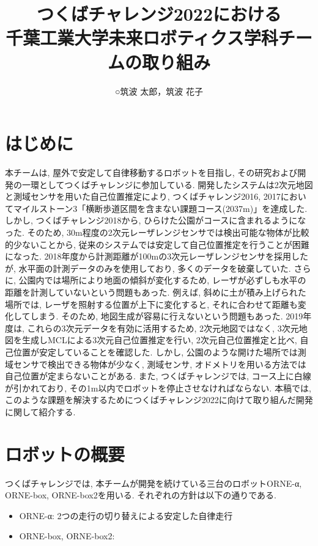 \documentclass[uplatex, twocolumn, 9pt]{jsproceedings}
\title{つくばチャレンジ2022における\\千葉工業大学未来ロボティクス学科チームの取り組み}
\author{○筑波 太郎\authorrefmark{1}，筑波 花子\authorrefmark{1}}
\affiliation{千葉工業大学未来ロボティクス学科チームα, box, box2}
\begin{document}
\maketitle


\section{はじめに}
本チームは, 屋外で安定して自律移動するロボットを目指し, その研究および開発の一環としてつくばチャレンジに参加している. 開発したシステムは2次元地図と測域センサを用いた自己位置推定により, つくばチャレンジ2016, 2017においてマイルストーン3「横断歩道区間を含まない課題コース(2037m)」を達成した. しかし, つくばチャレンジ2018から, ひらけた公園がコースに含まれるようになった. そのため, 30m程度の2次元レーザレンジセンサでは検出可能な物体が比較的少ないことから, 従来のシステムでは安定して自己位置推定を行うことが困難になった. 2018年度から計測距離が100mの3次元レーザレンジセンサを採用したが, 水平面の計測データのみを使用しており, 多くのデータを破棄していた. さらに, 公園内では場所により地面の傾斜が変化するため, レーザが必ずしも水平の距離を計測していないという問題もあった. 例えば, 斜めに土が積み上げられた場所では, レーザを照射する位置が上下に変化すると, それに合わせて距離も変化してしまう. そのため, 地図生成が容易に行えないという問題もあった. 2019年度は, これらの3次元データを有効に活用するため, 2次元地図ではなく, 3次元地図を生成しMCLによる3次元自己位置推定を行い, 2次元自己位置推定と比べ, 自己位置が安定していることを確認した. しかし, 公園のような開けた場所では測域センサで検出できる物体が少なく, 測域センサ, オドメトリを用いる方法では自己位置が定まらないことがある. また, つくばチャレンジでは, コース上に白線が引かれており, その1m以内でロボットを停止させなければならない. 本稿では, このような課題を解決するためにつくばチャレンジ2022に向けて取り組んだ開発に関して紹介する. 

\section{ロボットの概要}
つくばチャレンジでは, 本チームが開発を続けている三台のロボットORNE-α, ORNE-box, ORNE-box2を用いる. それぞれの方針は以下の通りである. 
\begin{itemize}
  \item ORNE-α: 2つの走行の切り替えによる安定した自律走行
  \item ORNE-box, ORNE-box2: 
\end{itemize}
\end{document}
